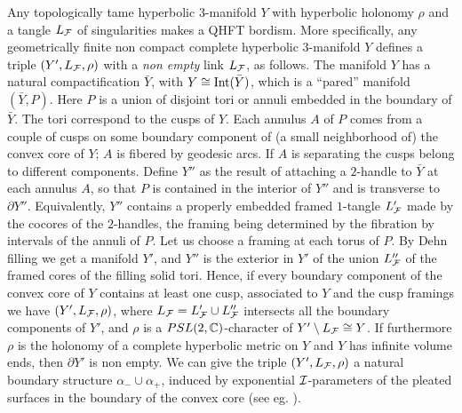  Any
topologically tame hyperbolic $3$-manifold $Y$ with hyperbolic
holonomy $\rho$ and a tangle $L_{\mathcal F}$ of singularities makes a QHFT
bordism. More specifically, any geometrically finite non compact
complete hyperbolic $3$-manifold $Y$ defines a triple
$(Y',L_{\mathcal F},\rho)$ with a {\it non empty} link $L_{\mathcal F}$, as follows.
The manifold $Y$ has a natural compactification $\bar{Y}$, with $Y
\cong {\rm Int}(\bar{Y})$, which is a ``pared'' manifold
$(\bar{Y},P)$. Here $P$ is a union of disjoint tori or annuli
embedded in the boundary of $\bar{Y}$. The tori correspond to the
cusps of $Y$. Each annulus $A$ of $P$ comes from a couple of cusps
on some boundary component of (a small neighborhood of) the convex
core of $Y$; $A$ is fibered by geodesic arcs. If $A$ is separating
the cusps belong to different components. Define $Y''$ as the
result of attaching a $2$-handle to $\bar{Y}$ at each annulus $A$,
so that $P$ is contained in the interior of $Y''$ and is
transverse to $\partial Y''$. Equivalently, $Y''$ contains a
properly embedded framed $1$-tangle $L_{\mathcal F}'$ made by the cocores
of the $2$-handles, the framing being determined by the fibration
by intervals of the annuli of $P$. Let us choose a framing at each
torus of $P$. By Dehn filling we get a manifold $Y'$, and $Y''$ is
the exterior in $Y'$ of the union $L_{\mathcal F}''$ of the framed cores of
the filling solid tori. Hence, if every boundary component of the
convex core of $Y$ contains at least one cusp, associated to $Y$
and the cusp framings we have $(Y',L_{\mathcal F},\rho)$, where $L_{\mathcal F}
=L_{\mathcal F}' \cup L_{\mathcal F}''$ intersects all the boundary components of
$Y'$, and $\rho$ is a $PSL(2,\mathbb{C})$-character of $Y'\setminus L_{\mathcal F}
\cong Y$. If furthermore $\rho$ is the holonomy of a complete
hyperbolic metric on $Y$ and $Y$ has infinite volume ends, then
$\partial Y'$ is non empty. We can give the triple
$(Y',L_{\mathcal F},\rho)$ a natural boundary structure $\alpha_- \cup
\alpha_+$, induced by exponential ${\mathcal I}$-parameters of the pleated
surfaces in the boundary of the convex core (see eg. \cite{Ep}).

